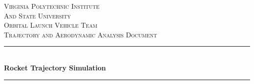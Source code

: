 \documentclass[11pt,dvipsnames]{thesis}
\begin{document}


\begin{titlepage} %
	\newcommand{\HRule}{\rule{\linewidth}{0.5mm}} %
	
	\center %
	
	\textsc{\LARGE Virginia Polytechnic Institute\\And State University}\\[1.5cm] %
	
	\textsc{\Large Orbital Launch Vehicle Team}\\[0.5cm] %
	
	\textsc{\large Trajectory and Aerodynamic Analysis Document}\\[0.5cm] %
	
	\HRule\\[0.4cm]%

	{\huge\bfseries Rocket Trajectory Simulation}\\[0.0cm]%
	
	\HRule\\[1.5cm]
	
	

\end{titlepage}
\end{document}
